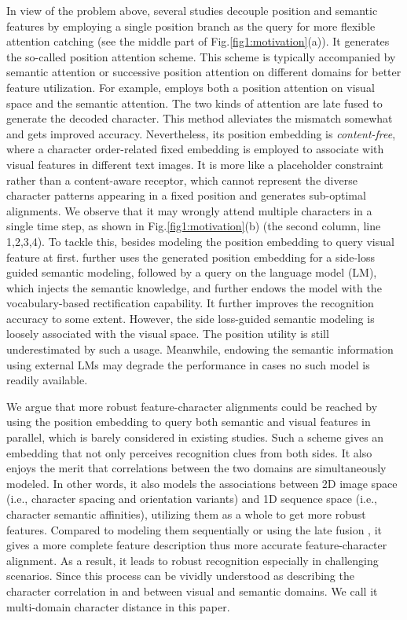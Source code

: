 In view of the problem above, several studies \citep{wan2020textscanner,yue2020robustscanner,SRNyu2020towards,ABInet21CVPR} decouple position and semantic features by employing a single position branch as the query for more flexible attention catching (see the middle part of Fig.\ref{fig1:motivation}(a)). It generates the so-called position attention scheme. This scheme is typically accompanied by semantic attention or successive position attention on different domains for better feature utilization. For example, \citep{yue2020robustscanner} employs both a position attention on visual space and the semantic attention. The two kinds of attention are late fused to generate the decoded character. This method alleviates the mismatch somewhat and gets improved accuracy. Nevertheless, its position embedding is \emph{content-free}, where a character order-related fixed embedding is employed to associate with visual features in different text images. It is more like a placeholder constraint rather than a content-aware receptor, which cannot represent the diverse character patterns appearing in a fixed position and generates sub-optimal alignments. We observe that it may wrongly attend multiple characters in a single time step, as shown in Fig.\ref{fig1:motivation}(b) (the second column, line 1,2,3,4). To tackle this, besides modeling the position embedding to query visual feature at first. \citep{ABInet21CVPR} further uses the generated position embedding for a side-loss guided semantic modeling, followed by a query on the language model (LM), which injects the semantic knowledge, and further endows the model with the vocabulary-based rectification capability. It further improves the recognition accuracy to some extent. However, the side loss-guided semantic modeling is loosely associated with the visual space. The position utility is still underestimated by such a usage. Meanwhile, endowing the semantic information using external LMs may degrade the performance in cases no such model is readily available.


We argue that more robust feature-character alignments could be reached by using the position embedding to query both semantic and visual features in parallel, which is barely considered in existing studies. Such a scheme gives an embedding that not only perceives recognition clues from both sides. It also enjoys the merit that correlations between the two domains are simultaneously modeled. In other words, it also models the associations between 2D image space (i.e., character spacing and orientation variants) and 1D sequence space (i.e., character semantic affinities), utilizing them as a whole to get more robust features. Compared to modeling them sequentially \citep{SRNyu2020towards,ABInet21CVPR} or using the late fusion \citep{yue2020robustscanner}, it gives a more complete feature description thus more accurate feature-character alignment. As a result, it leads to robust recognition especially in challenging scenarios. Since this process can be vividly understood as describing the character correlation in and between visual and semantic domains. We call it multi-domain character distance in this paper.


